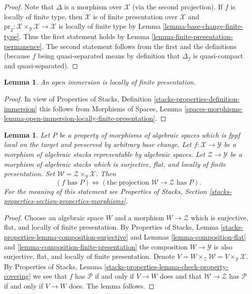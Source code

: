\documentclass{stacks-project}
\theoremstyle{plain}
\newtheorem{lemma}[subsection]{Lemma}
\theoremstyle{definition}
\theoremstyle{remark}
\numberwithin{equation}{subsection}
\begin{document}
\begin{proof}
Note that $\Delta$ is a morphism over $\mathcal{X}$ (via the second
projection). If $f$ is locally of finite type, then
$\mathcal{X}$ is of finite presentation over $\mathcal{X}$ and
$\text{pr}_2 : \mathcal{X} \times_\mathcal{Y} \mathcal{X} \to \mathcal{X}$
is locally of finite type by Lemma \ref{lemma-base-change-finite-type}.
Thus the first statement holds by
Lemma \ref{lemma-finite-presentation-permanence}.
The second statement follows from the first and
the definitions (because $f$ being quasi-separated means
by definition that $\Delta_f$ is quasi-compact and quasi-separated).
\end{proof}

\begin{lemma}
\label{lemma-open-immersion-locally-finite-presentation}
An open immersion is locally of finite presentation.
\end{lemma}

\begin{proof}
In view of Properties of Stacks, Definition
\ref{stacks-properties-definition-immersion}
this follows from
Morphisms of Spaces,
Lemma \ref{spaces-morphisms-lemma-open-immersion-locally-finite-presentation}.
\end{proof}

\begin{lemma}
\label{lemma-check-property-after-fppf-base-change}
Let $P$ be a property of morphisms of algebraic spaces which is
fppf local on the target and preserved by arbitrary base change.
Let $f : \mathcal{X} \to \mathcal{Y}$ be a morphism of algebraic stacks
representable by algebraic spaces.
Let $\mathcal{Z} \to \mathcal{Y}$ be a morphism of algebraic stacks which
is surjective, flat, and locally of finite presentation.
Set $\mathcal{W} = \mathcal{Z} \times_\mathcal{Y} \mathcal{X}$. Then
$$
(f\text{ has }P) \Leftrightarrow
(\text{the projection }\mathcal{W} \to \mathcal{Z}\text{ has }P).
$$
For the meaning of this statement see
Properties of Stacks, Section
\ref{stacks-properties-section-properties-morphisms}.
\end{lemma}

\begin{proof}
Choose an algebraic space $W$ and a morphism
$W \to \mathcal{Z}$ which is surjective, flat, and locally of finite
presentation. By
Properties of Stacks, Lemma
\ref{stacks-properties-lemma-composition-surjective}
and Lemmas \ref{lemma-composition-flat} and
\ref{lemma-composition-finite-presentation}
the composition $W \to \mathcal{Y}$ is also surjective, flat, and
locally of finite presentation. Denote
$V = W \times_\mathcal{Z} \mathcal{W} = V \times_\mathcal{Y} \mathcal{X}$.
By Properties of Stacks, Lemma
\ref{stacks-properties-lemma-check-property-covering}
we see that $f$ has $\mathcal{P}$ if and only if $V \to W$ does
and that $\mathcal{W} \to \mathcal{Z}$ has $\mathcal{P}$ if and only
if $V \to W$ does. The lemma follows.
\end{proof}
\end{document}
